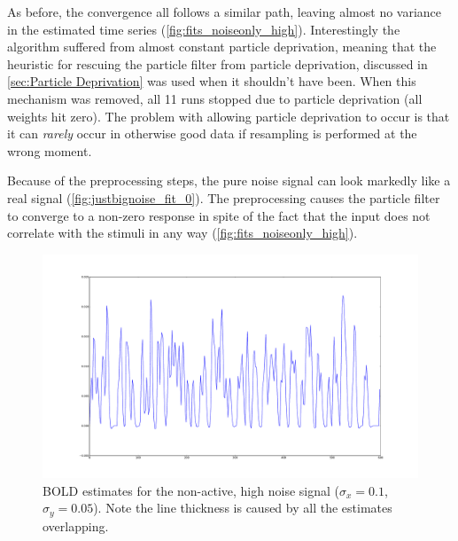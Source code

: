 As before, the convergence all follows a similar path, leaving almost no
variance in the estimated time series (\autoref{fig:fits_noiseonly_high}).
Interestingly the algorithm suffered from almost constant particle deprivation,
meaning that the heuristic
for rescuing the particle filter from particle deprivation, discussed in
\autoref{sec:Particle Deprivation} was used when it shouldn't have been.
 When this mechanism
was removed, all 11 runs stopped due to particle deprivation (all weights hit zero).
The problem with allowing particle deprivation to occur is that it can \emph{rarely}
occur in otherwise good data if resampling is performed at the wrong moment.

Because of the preprocessing steps, the pure noise signal can look markedly like a real
signal (\autoref{fig:justbignoise_fit_0}). The preprocessing causes the particle filter
to converge to a non-zero response in spite of the fact that the input does not correlate
with the stimuli in any way (\autoref{fig:fits_noiseonly_high}).

\begin{figure}[H]
\centering
\includegraphics[clip=true,trim=6cm 2cm 5cm 3cm,width=15cm]{images/fits_noiseonly_high}
\caption[\ac{BOLD} estimates for the non-active, high noise signal ($\sigma_x = 0.1$, $\sigma_y = 0.05$).]
{\ac{BOLD} estimates for the non-active, high noise signal ($\sigma_x = 0.1$, $\sigma_y = 0.05$). 
Note the line thickness is caused by all the estimates overlapping.}
\label{fig:fits_noiseonly_high}
\end{figure}


